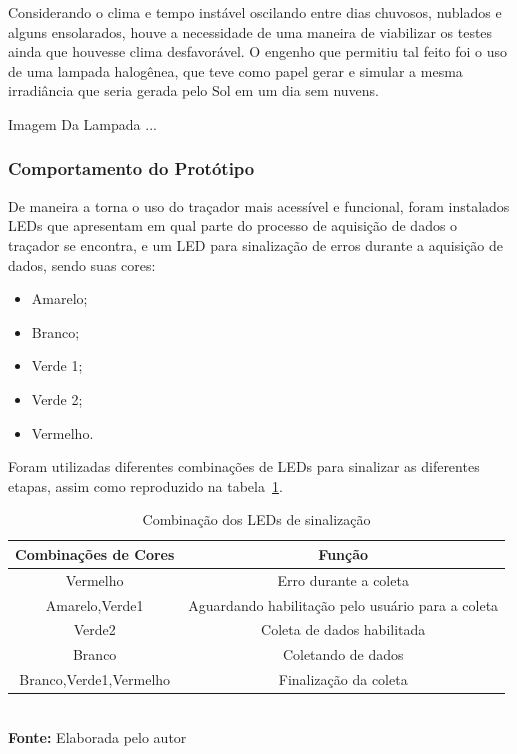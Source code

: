 Considerando o clima e tempo instável oscilando entre dias chuvosos, nublados e alguns ensolarados, houve a necessidade de uma maneira de viabilizar os testes ainda que houvesse clima desfavorável. O engenho que permitiu tal feito foi o uso de uma lampada halogênea, que teve como papel gerar e simular a mesma irradiância que seria gerada pelo Sol em um dia sem nuvens.  

Imagem Da Lampada
...

\subsubsection{Comportamento do Protótipo}

De maneira a torna o uso do traçador mais acessível e funcional, foram instalados LEDs que apresentam em qual parte do processo de aquisição de dados o traçador se encontra, e um LED para sinalização de erros durante a aquisição de dados, sendo suas cores:

\begin{itemize}
	\item Amarelo;
	\item Branco;
	\item Verde 1;
	\item Verde 2;
	\item Vermelho.
\end{itemize}

Foram utilizadas diferentes combinações de LEDs para sinalizar as diferentes etapas, assim como  reproduzido na tabela~\ref{tab:LEDS}.

\FloatBarrier
\begin{table}[!htbp]
	\centering
	\caption{Combinação dos LEDs de sinalização}
	\begin{tabular}{ c | c }
		\hline
		\textbf{Combinações de Cores} & \textbf{Função}                                   \\ \hline
		Vermelho                      & Erro durante a coleta                             \\ \hline
		Amarelo,Verde1                & Aguardando habilitação pelo usuário para a coleta \\ \hline
		Verde2                        & Coleta de dados habilitada                        \\ \hline
		Branco                        & Coletando de dados                                \\ \hline
		Branco,Verde1,Vermelho        & Finalização da coleta                             \\ \hline
	\end{tabular}
	\\ \vspace{0.2cm}
	\textbf{Fonte:} Elaborada pelo autor
	\label{tab:LEDS}
\end{table}
\FloatBarrier




